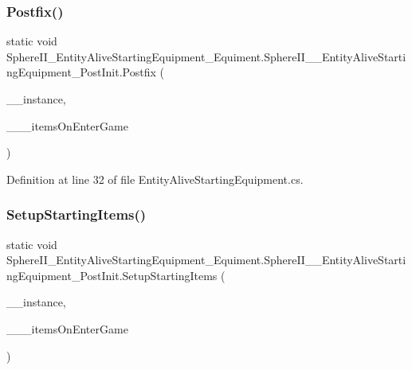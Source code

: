 \subsubsection{\texorpdfstring{Postfix()}{Postfix()}}
{\footnotesize\ttfamily static void Sphere\+I\+I\+\_\+\+Entity\+Alive\+Starting\+Equipment\+\_\+\+Equiment.\+Sphere\+I\+I\+\_\+\+\_\+\+Entity\+Alive\+Starting\+Equipment\+\_\+\+Post\+Init.\+Postfix (\begin{DoxyParamCaption}\item[{Entity\+Enemy}]{\+\_\+\+\_\+instance,  }\item[{List$<$ Item\+Stack $>$}]{\+\_\+\+\_\+\+\_\+items\+On\+Enter\+Game }\end{DoxyParamCaption})\hspace{0.3cm}{\ttfamily [static]}}



Definition at line 32 of file Entity\+Alive\+Starting\+Equipment.\+cs.

\mbox{\label{class_sphere_i_i___entity_alive_starting_equipment___equiment_1_1_sphere_i_i_____entity_alive_starting_equipment___post_init_a2b3725e0c5ce3bcd7d2fb9220718828b}} 
\subsubsection{\texorpdfstring{SetupStartingItems()}{SetupStartingItems()}}
{\footnotesize\ttfamily static void Sphere\+I\+I\+\_\+\+Entity\+Alive\+Starting\+Equipment\+\_\+\+Equiment.\+Sphere\+I\+I\+\_\+\+\_\+\+Entity\+Alive\+Starting\+Equipment\+\_\+\+Post\+Init.\+Setup\+Starting\+Items (\begin{DoxyParamCaption}\item[{Entity\+Enemy}]{\+\_\+\+\_\+instance,  }\item[{List$<$ Item\+Stack $>$}]{\+\_\+\+\_\+\+\_\+items\+On\+Enter\+Game }\end{DoxyParamCaption})\hspace{0.3cm}{\ttfamily [static]}}



